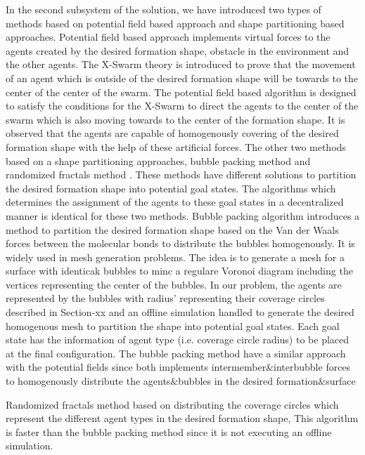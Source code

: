 \documentclass[twoside]{article}
\begin{document}
       In the second subsystem of the solution, we have introduced two types of methods based on potential field based approach and shape partitioning based approaches. Potential field based approach implements virtual forces to the agents created by the desired formation shape, obstacle in the environment and the other agents. The X-Swarm theory is introduced to prove that the movement of an agent which is outside of the desired formation shape will be towards to the center of the center of the swarm. The potential field based algorithm is designed to satisfy the conditions for the X-Swarm to direct the agents to the center of the swarm which is also moving towards to the center of the formation shape. It is observed that the agents are capable of homogenously covering of the desired formation shape with the help of these artificial forces.
       The other two methods based on a shape partitioning approaches, bubble packing method and randomized fractals method . These methods have different solutions to partition the desired formation shape into potential goal states. The algorithms which determines the assignment of the agents to these goal states in a decentralized manner is identical for these two methods. 
       Bubble packing algorithm introduces a method to partition the desired formation shape based on the Van der Waals forces between the molecular bonds to distribute the bubbles homogenously. It is widely used in mesh generation problems. The idea is to generate a mesh for a surface with identicak bubbles to minc a regulare Voronoi diagram including the vertices representing the center of the bubbles. In our problem, the agents are represented by the  bubbles with radius' representing their coverage circles described in Section-xx and an offline simulation handled to generate the desired homogenous mesh to partition the shape into potential goal states. Each goal state has the information of agent type (i.e. coverage circle radius) to be placed at the final configuration. The bubble packing method have a similar approach with the potential fields since both implements intermember$\&$interbubble forces to homogenously distribute the agents$\&$bubbles in the desired formation$\&$surface 
       
       Randomized fractals method based on distributing the coverage circles which represent the different agent types in the desired formation shape, This algorithm is faster than the bubble packing method since it is not executing an offline simulation. 
       
\end{document}
